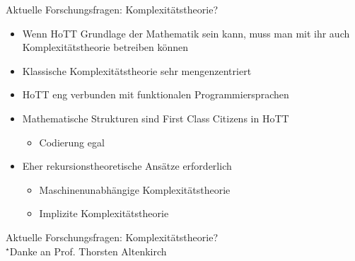 \documentclass[11pt,aspectratio=169,notheorems]{beamer}
\begin{document}
\begin{frame}{Aktuelle Forschungsfragen: Komplexitätstheorie?}
    \begin{itemize}
        \item Wenn HoTT Grundlage der Mathematik sein kann, muss man mit ihr auch Komplexitätstheorie betreiben können
        \item Klassische Komplexitätstheorie sehr \glqq{}mengenzentriert\grqq{}
        \item HoTT eng verbunden mit funktionalen Programmiersprachen
    \end{itemize}

    \begin{itemize}
        \item Mathematische Strukturen sind \glqq{}First Class Citizens\grqq{} in HoTT
        \begin{itemize}
            \item Codierung egal
        \end{itemize}
        \item Eher rekursionstheoretische Ansätze erforderlich~\cite{ctinctt}
        \begin{itemize}
            \item Maschinenunabhängige Komplexitätstheorie
            \item Implizite Komplexitätstheorie~\cite{icc}
        \end{itemize}
    \end{itemize}
\end{frame}

\begin{frame}{Aktuelle Forschungsfragen: Komplexitätstheorie?}
    ~\\[2em]
    \tiny{$^\star$Danke an Prof. Thorsten Altenkirch~\cite{qtt1, qtt2}}
\end{frame}
\end{document}
